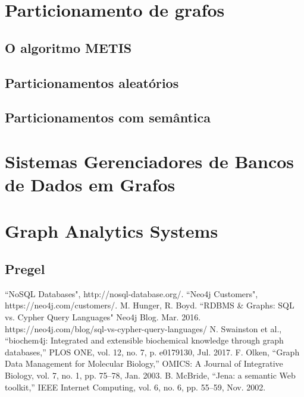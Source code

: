\documentclass[conference]{IEEEtran}
\begin{document}
\section{Particionamento de grafos}
\subsection{O algoritmo METIS}
\subsection{Particionamentos aleatórios}
\subsection{Particionamentos com semântica}

\section{Sistemas Gerenciadores de Bancos de Dados em Grafos}
\section{Graph Analytics Systems}
\subsection{Pregel}

\begin{thebibliography}{00}
 ``NoSQL Databases", http://nosql-database.org/.
 ``Neo4j Customers", https://neo4j.com/customers/.
 M. Hunger, R. Boyd. ``RDBMS \& Graphs: SQL vs. Cypher Query Languages" Neo4j Blog. Mar. 2016. https://neo4j.com/blog/sql-vs-cypher-query-languages/
 N. Swainston et al., ``biochem4j: Integrated and extensible biochemical knowledge through graph databases,” PLOS ONE, vol. 12, no. 7, p. e0179130, Jul. 2017. 
 F. Olken, ``Graph Data Management for Molecular Biology,” OMICS: A Journal of Integrative Biology, vol. 7, no. 1, pp. 75–78, Jan. 2003.
 B. McBride, ``Jena: a semantic Web toolkit,” IEEE Internet Computing, vol. 6, no. 6, pp. 55–59, Nov. 2002.

\end{thebibliography}
\end{document}
